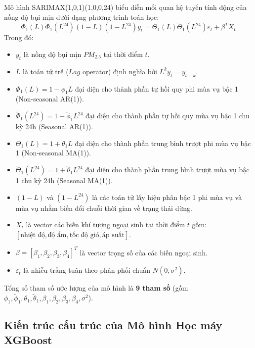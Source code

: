 \documentclass[12pt,a4paper]{article}
\begin{document}
Mô hình SARIMAX(1,0,1)(1,0,0,24) biểu diễn mối quan hệ tuyến tính động của nồng độ bụi mịn dưới dạng phương trình toán học:
\begin{equation}
    \Phi_1(L) \tilde{\Phi}_1(L^{24}) (1-L) (1-L^{24}) y_t = \Theta_1(L) \tilde{\Theta}_1(L^{24}) \varepsilon_t + \beta^T X_t
\end{equation}
Trong đó:
\begin{itemize}
    \item $y_t$ là nồng độ bụi mịn $PM_{2.5}$ tại thời điểm $t$.
    \item $L$ là toán tử trễ ($Lag$ operator) định nghĩa bởi $L^k y_t = y_{t-k}$.
    \item $\Phi_1(L) = 1 - \phi_1 L$ đại diện cho thành phần tự hồi quy phi mùa vụ bậc 1 (Non-seasonal AR(1)).
    \item $\tilde{\Phi}_1(L^{24}) = 1 - \tilde{\phi}_1 L^{24}$ đại diện cho thành phần tự hồi quy mùa vụ bậc 1 chu kỳ 24h (Seasonal AR(1)).
    \item $\Theta_1(L) = 1 + \theta_1 L$ đại diện cho thành phần trung bình trượt phi mùa vụ bậc 1 (Non-seasonal MA(1)).
    \item $\tilde{\Theta}_1(L^{24}) = 1 + \tilde{\theta}_1 L^{24}$ đại diện cho thành phần trung bình trượt mùa vụ bậc 1 chu kỳ 24h (Seasonal MA(1)).
    \item $(1-L)$ và $(1-L^{24})$ là các toán tử lấy hiệu phân bậc 1 phi mùa vụ và mùa vụ nhằm biến đổi chuỗi thời gian về trạng thái dừng.
    \item $X_t$ là vector các biến khí tượng ngoại sinh tại thời điểm $t$ gồm: $[\text{nhiệt độ}, \text{độ ẩm}, \text{tốc độ gió}, \text{áp suất}]$.
    \item $\beta = [\beta_1, \beta_2, \beta_3, \beta_4]^T$ là vector trọng số của các biến ngoại sinh.
    \item $\varepsilon_t$ là nhiễu trắng tuân theo phân phối chuẩn $N(0, \sigma^2)$.
\end{itemize}
Tổng số tham số ước lượng của mô hình là \textbf{9 tham số} (gồm $\phi_1, \tilde{\phi}_1, \theta_1, \tilde{\theta}_1, \beta_1, \beta_2, \beta_3, \beta_4, \sigma^2$).

\subsection{Kiến trúc cấu trúc của Mô hình Học máy XGBoost}
\end{document}
